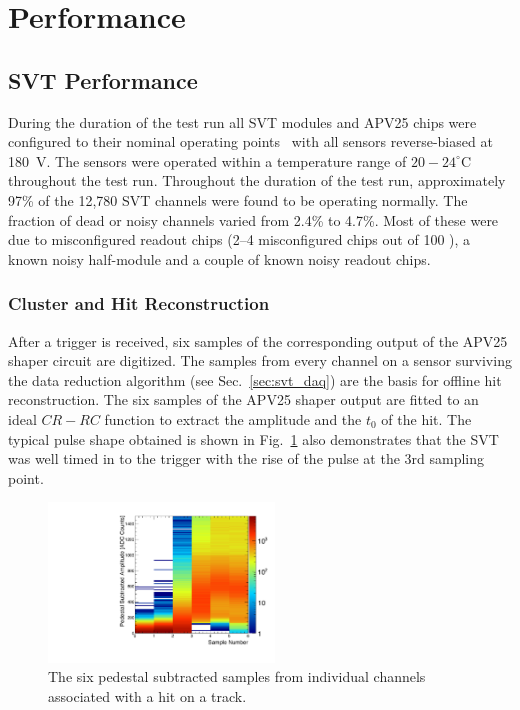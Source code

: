 \documentclass[final,3p,times,twocolumn]{elsarticle}
\begin{document}
\section{Performance}

\subsection{SVT Performance}

During the duration of the test run all SVT modules and APV25 chips were configured to their 
nominal operating points~\cite{Jones:1069892} with all sensors reverse-biased at 180~V.  The 
sensors were operated within a temperature range of  $20-24^\circ$C 
throughout the test run. 
Throughout the duration of the test run, approximately 97\% of the 12,780 SVT channels were found to
be operating normally. The fraction of dead or noisy channels varied from 2.4\% to 4.7\%.  
Most of these were due to misconfigured readout chips (2--4 misconfigured chips out of 100 ), 
a known noisy half-module and a couple of known noisy readout chips. 


\subsubsection{Cluster and Hit Reconstruction}

After a trigger is received, six samples of the corresponding output of the APV25 shaper circuit are digitized. The samples from every channel on a sensor surviving the 
data reduction algorithm (see Sec.~\ref{sec:svt_daq}) are the basis for offline hit reconstruction. 
The six samples of the APV25 shaper output 
are fitted to an ideal $CR-RC$ function to extract the amplitude and the $t_0$ of the hit. 
The typical pulse shape obtained is shown in Fig.~\ref{fig:pulse_shape} also demonstrates that the SVT 
was well timed in to the trigger with the rise of the pulse at the 3rd sampling point.
\begin{figure}[]
\begin{center}
{\small
	\includegraphics[width=6cm]{figures/run1351_110513_samples_L1_top.pdf}
	\caption{The six pedestal subtracted samples from individual channels associated with a hit on a 
	track.}
	\label{fig:pulse_shape}
}
\end{center}
\end{figure}
\end{document}
